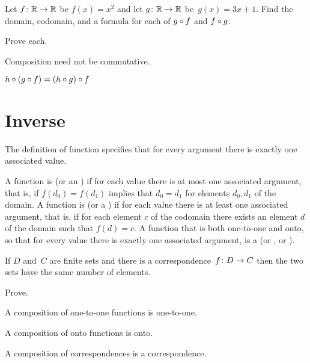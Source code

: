 \documentclass{ibl}
\begin{document}
\begin{ex}
Let $\mbox{$f\colon \mathbb{R}\to \mathbb{R}$}$ be $f(x)=x^2$ and let $\mbox{$g\colon \mathbb{R}\to \mathbb{R}$}$ be~$g(x)=3x+1$.
Find the domain, codomain, and a formula for each of
$g\mathbin{\circ} f$ and $f\mathbin{\circ} g$.  
\end{ex}

\begin{ex}Prove each.
\begin{exes}
\item Composition need not be commutative.
\item{} 
  $h\mathbin{\circ} (g\mathbin{\circ} f)=(h\mathbin{\circ} g)\mathbin{\circ} f$    
\end{exes}
\end{ex}





\section{Inverse}

The definition of function specifies that for every argument there is 
exactly one associated value.

\begin{df}
A function is  (or an ) 
if for each value there is at most
one associated argument, that is, if $f(d_0)=f(d_1)$ implies that $d_0=d_1$
for elements $d_0,d_1$ of the domain.
A function is  (or a ) 
if for each value there is at least
one associated argument, that is, if for each element $c$ of the codomain
there exists an element $d$ of the domain such that $f(d)=c$.
A function that is both one-to-one and onto, so that for every value there
is exactly one associated argument, is a 
 (or , or ).
\end{df}

\begin{ex}
If $D$ and~$C$ are finite sets and there is a 
correspondence~$\mbox{$f\colon D\to C$}$
then the two sets
have the same number of elements.  
\end{ex}

\begin{ex} Prove.
\begin{exes}
\item A composition of one-to-one functions is one-to-one.
\item A composition of onto functions is onto.
\item A composition of correspondences is a correspondence.    
\end{exes}
\end{ex}
\end{document}
